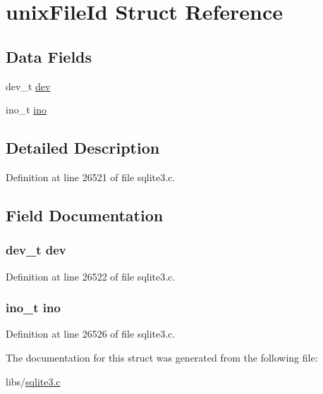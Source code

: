 \hypertarget{structunix_file_id}{}\section{unix\+File\+Id Struct Reference}
\label{structunix_file_id}
\subsection*{Data Fields}
\begin{DoxyCompactItemize}
\item 
dev\+\_\+t \hyperlink{structunix_file_id_a8910285a0352a5c710e65ec9ecbe32a1}{dev}
\item 
ino\+\_\+t \hyperlink{structunix_file_id_aa9c25ec6cb415e0c2d201fc9205e73d0}{ino}
\end{DoxyCompactItemize}


\subsection{Detailed Description}


Definition at line 26521 of file sqlite3.\+c.



\subsection{Field Documentation}
\hypertarget{structunix_file_id_a8910285a0352a5c710e65ec9ecbe32a1}{}
\subsubsection[{dev}]{\setlength{\rightskip}{0pt plus 5cm}dev\+\_\+t dev}\label{structunix_file_id_a8910285a0352a5c710e65ec9ecbe32a1}


Definition at line 26522 of file sqlite3.\+c.

\hypertarget{structunix_file_id_aa9c25ec6cb415e0c2d201fc9205e73d0}{}
\subsubsection[{ino}]{\setlength{\rightskip}{0pt plus 5cm}ino\+\_\+t ino}\label{structunix_file_id_aa9c25ec6cb415e0c2d201fc9205e73d0}


Definition at line 26526 of file sqlite3.\+c.



The documentation for this struct was generated from the following file\+:\begin{DoxyCompactItemize}
\item 
libs/\hyperlink{sqlite3_8c}{sqlite3.\+c}\end{DoxyCompactItemize}
